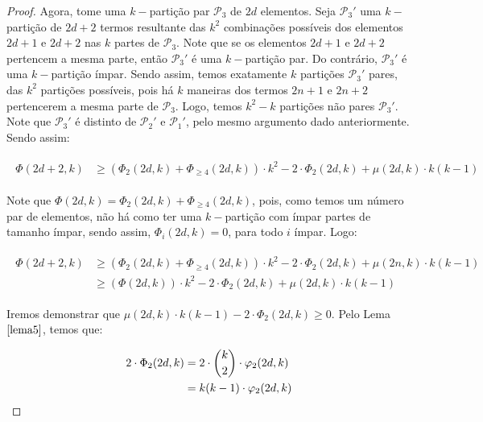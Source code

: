 \documentclass[12pt]{article}
\begin{document}
\begin{proof}
  	 Agora, tome uma $k-$partição par $\mathcal{P}_3$ de $2d$ elementos. Seja $\mathcal{P}_3'$ uma $k-$partição de $2d+2$ termos resultante das $k^2$ combinações possíveis dos elementos $2d+1$ e $2d+2$ nas $k$ partes de $\mathcal{P}_3$. Note que se os elementos $2d+1$ e $2d+2$ pertencem a mesma parte, então $\mathcal{P}_3'$ é uma $k-$partição par. Do contrário, $\mathcal{P}_3'$ é uma $k-$partição ímpar. Sendo assim, temos exatamente $k$ partições $\mathcal{P}_3'$ pares, das $k^2$ partições possíveis, pois há $k$ maneiras dos termos $2n+1$ e $2n+2$ pertencerem a mesma parte de $\mathcal{P}_3$. Logo, temos $k^2 - k$ partições não pares $\mathcal{P}_3'$. Note que $\mathcal{P}_3'$ é distinto de $\mathcal{P}_2'$ e $\mathcal{P}_1'$, pelo mesmo argumento dado anteriormente. Sendo assim: 	
  	
  	 \begin{align}
  		\begin{split}
  			\Phi(2d+2, k) &\geq (\Phi_{2}(2d, k) + \Phi_{\geq 4}(2d, k)) \cdot k^2 - 2 \cdot \Phi_{2}(2d, k) + \mu(2d, k)\cdot k  (k-1)
  		\end{split} 
  	\end{align}  
  	
  	Note que $\Phi(2d, k) = \Phi_2(2d, k) + \Phi_{\geq 4}(2d, k)$, pois, como temos um número par de elementos, não há como ter uma $k-$partição com ímpar partes de tamanho ímpar, sendo assim, $\Phi_i(2d, k) = 0$, para todo $i$ ímpar. Logo: \newl
  	 
  	
  	\begin{align}
  		\begin{split}
  			\Phi(2d+2, k) &\geq (\Phi_{2}(2d, k) + \Phi_{\geq 4}(2d, k)) \cdot k^2 - 2 \cdot \Phi_{2}(2d, k) + \mu(2n, k)\cdot k  (k-1) \\
  			&\geq (\Phi(2d, k)) \cdot k^2 - 2 \cdot \Phi_{2}(2d, k) + \mu(2d, k)\cdot k  (k-1)
  		\end{split} 
  	\end{align}   
  	
  	Iremos demonstrar que $\mu(2d, k)\cdot k  (k-1) - 2 \cdot \Phi_2(2d, k) \geq 0$. Pelo Lema $\ref{lema5}$, temos que: 
  	
  	\begin{align}
  		\begin{split}
  			2 \cdot \Phi_2(2d, k) &= 2 \cdot \escolhe{k}{2} \cdot \varphi_2(2d, k) \\
  			& = k(k-1) \cdot \varphi_2(2d, k)
  		\end{split} 
  	\end{align}  
  	

\end{proof}
\end{document}
